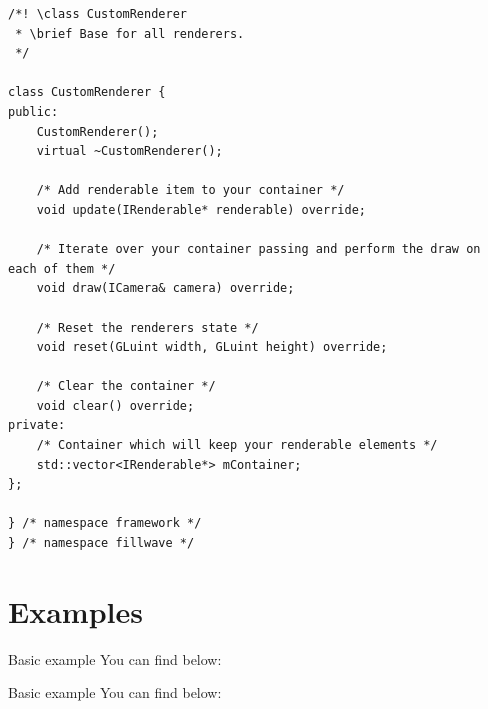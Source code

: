 \documentclass{article}
\begin{document}
\begin{lstlisting}
/*! \class CustomRenderer
 * \brief Base for all renderers.
 */

class CustomRenderer {
public:
	CustomRenderer();
	virtual ~CustomRenderer();

	/* Add renderable item to your container */
	void update(IRenderable* renderable) override;
	
	/* Iterate over your container passing and perform the draw on each of them */
	void draw(ICamera& camera) override;
	
	/* Reset the renderers state */
	void reset(GLuint width, GLuint height) override;
	
	/* Clear the container */
	void clear() override;
private:
	/* Container which will keep your renderable elements */
	std::vector<IRenderable*> mContainer;
};

} /* namespace framework */
} /* namespace fillwave */

\end{lstlisting}

\section{Examples}

Basic example You can find below:


Basic example You can find below:
\newpage

\large
\end{document}
